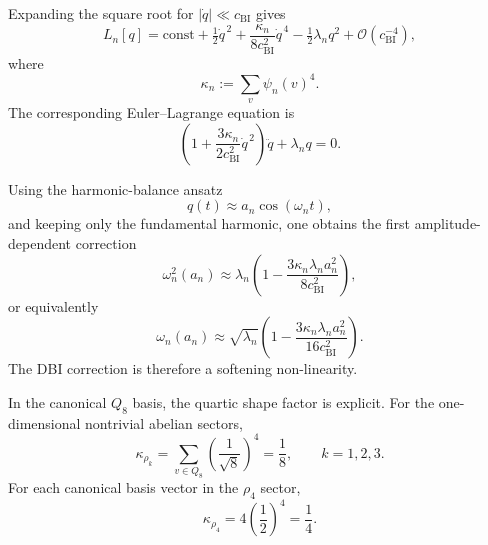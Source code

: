 \documentclass[11pt,a4paper]{article}
\begin{document}
  Expanding the square root for $|\dot{q}| \ll c_{\mathrm{BI}}$ gives
  \begin{equation}
    \label{eq:mode-lagrangian-expansion}
    L_n[q]
    =
    \mathrm{const}
    + \tfrac{1}{2}\dot{q}^{\,2}
    + \frac{\kappa_n}{8c_{\mathrm{BI}}^2}\dot{q}^{\,4}
    - \tfrac{1}{2}\lambda_n q^2
    + \mathcal{O}(c_{\mathrm{BI}}^{-4}),
  \end{equation}
  where
  \begin{equation}
    \label{eq:kappa-def}
    \kappa_n := \sum_v \psi_n(v)^4.
  \end{equation}
  The corresponding Euler--Lagrange equation is
  \begin{equation}
    \label{eq:weakly-nonlinear-mode-equation}
    \left(
      1 + \frac{3\kappa_n}{2c_{\mathrm{BI}}^2}\dot{q}^{\,2}
    \right)\ddot{q}
    + \lambda_n q
    = 0.
  \end{equation}

  Using the harmonic-balance ansatz
  \begin{equation}
    q(t) \approx a_n \cos(\omega_n t),
  \end{equation}
  and keeping only the fundamental harmonic, one obtains the first
  amplitude-dependent correction
  \begin{equation}
    \label{eq:omega-shift-square}
    \omega_n^2(a_n)
    \approx
    \lambda_n
    \left(
      1 - \frac{3\kappa_n\lambda_n a_n^2}{8c_{\mathrm{BI}}^2}
    \right),
  \end{equation}
  or equivalently
  \begin{equation}
    \label{eq:omega-shift}
    \omega_n(a_n)
    \approx
    \sqrt{\lambda_n}
    \left(
      1 - \frac{3\kappa_n\lambda_n a_n^2}{16c_{\mathrm{BI}}^2}
    \right).
  \end{equation}
  The DBI correction is therefore a softening non-linearity.

  In the canonical $Q_8$ basis, the quartic shape factor is explicit.
  For the one-dimensional nontrivial abelian sectors,
  \begin{equation}
    \label{eq:kappa-abelian}
    \kappa_{\rho_k}
    =
    \sum_{v \in Q_8} \left(\frac{1}{\sqrt{8}}\right)^4
    =
    \frac{1}{8},
    \qquad
    k = 1,2,3.
  \end{equation}
  For each canonical basis vector in the $\rho_4$ sector,
  \begin{equation}
    \label{eq:kappa-nonabelian}
    \kappa_{\rho_4}
    =
    4 \left(\frac{1}{2}\right)^4
    =
    \frac{1}{4}.
  \end{equation}
\end{document}
